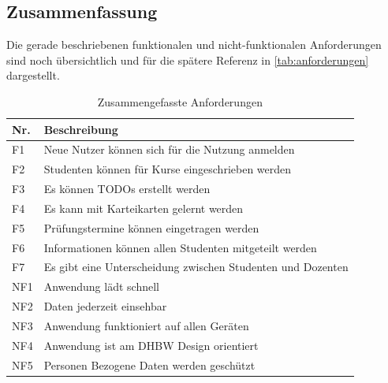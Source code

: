 \subsection{Zusammenfassung}
Die gerade beschriebenen funktionalen und nicht-funktionalen Anforderungen sind noch übersichtlich und für die spätere Referenz in \autoref{tab:anforderungen} dargestellt.


\begin{table}[h]
    \centering
    \begin{tabularx}{.8\textwidth}{l|X}
        Nr.     & Beschreibung                              \\\hline
        F1      & Neue Nutzer können sich für die Nutzung anmelden                    \\
        F2      & Studenten können für Kurse eingeschrieben werden  \\
        F3      & Es können TODOs erstellt werden   \\
        F4      & Es kann mit Karteikarten gelernt werden  \\
        F5      & Prüfungstermine können eingetragen werden  \\
        F6      & Informationen können allen Studenten mitgeteilt werden  \\
        F7      & Es gibt eine Unterscheidung zwischen Studenten und Dozenten  \\
        NF1     & Anwendung lädt schnell                    \\
        NF2     & Daten jederzeit einsehbar                 \\
        NF3     & Anwendung funktioniert auf allen Geräten  \\
        NF4     & Anwendung ist am DHBW Design orientiert   \\
        NF5     & Personen Bezogene Daten werden geschützt  \\
    \end{tabularx}
    \caption{Zusammengefasste Anforderungen}
    \label{tab:anforderungen}
\end{table}

